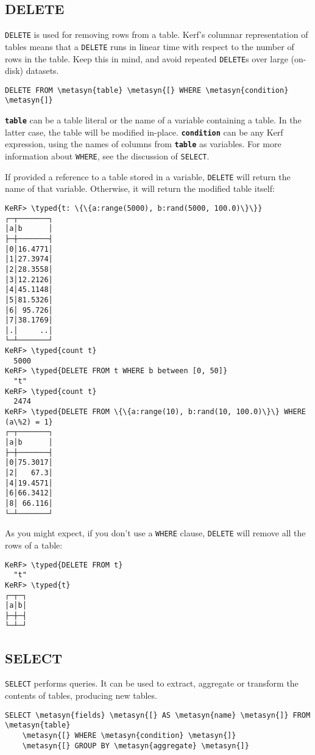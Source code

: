 \documentclass{article}
\newcommand{\typed}[1]{\textcolor{TealBlue}{#1}}
\newcommand{\metasyn}[1]{\texttt{\textbf{#1}}}
\begin{document}
\vspace{0.5cm}

\pagebreak
\subsection{DELETE}
\texttt{DELETE} is used for removing rows from a table. Kerf's columnar representation of tables means that a \texttt{DELETE} runs in linear time with respect to the number of rows in the table. Keep this in mind, and avoid repeated \texttt{DELETE}s over large (on-disk) datasets.
\begin{Verbatim}
DELETE FROM \metasyn{table} \metasyn{[} WHERE \metasyn{condition} \metasyn{]}
\end{Verbatim}

\metasyn{table} can be a table literal or the name of a variable containing a table. In the latter case, the table will be modified in-place. \metasyn{condition} can be any Kerf expression, using the names of columns from \metasyn{table} as variables. For more information about \texttt{WHERE}, see the discussion of \texttt{SELECT}.

\vspace{0.5cm}

If provided a reference to a table stored in a variable, \texttt{DELETE} will return the name of that variable. Otherwise, it will return the modified table itself:
\begin{Verbatim}
KeRF> \typed{t: \{\{a:range(5000), b:rand(5000, 100.0)\}\}}
┌─┬───────┐
│a│b      │
├─┼───────┤
│0│16.4771│
│1│27.3974│
│2│28.3558│
│3│12.2126│
│4│45.1148│
│5│81.5326│
│6│ 95.726│
│7│38.1769│
│.│     ..│
└─┴───────┘
KeRF> \typed{count t}
  5000
KeRF> \typed{DELETE FROM t WHERE b between [0, 50]}
  "t"
KeRF> \typed{count t}
  2474
KeRF> \typed{DELETE FROM \{\{a:range(10), b:rand(10, 100.0)\}\} WHERE (a\%2) = 1}
┌─┬───────┐
│a│b      │
├─┼───────┤
│0│75.3017│
│2│   67.3│
│4│19.4571│
│6│66.3412│
│8│ 66.116│
└─┴───────┘
\end{Verbatim}

As you might expect, if you don't use a \texttt{WHERE} clause, \texttt{DELETE} will remove all the rows of a table:
\begin{Verbatim}
KeRF> \typed{DELETE FROM t}
  "t"
KeRF> \typed{t}
┌─┬─┐
│a│b│
├─┼─┤
└─┴─┘
\end{Verbatim}

\pagebreak
\subsection{SELECT}\label{sec:select}
\texttt{SELECT} performs queries. It can be used to extract, aggregate or transform the contents of tables, producing new tables.
\begin{Verbatim}
SELECT \metasyn{fields} \metasyn{[} AS \metasyn{name} \metasyn{]} FROM \metasyn{table}
	\metasyn{[} WHERE \metasyn{condition} \metasyn{]}
	\metasyn{[} GROUP BY \metasyn{aggregate} \metasyn{]}
\end{Verbatim}
\end{document}
